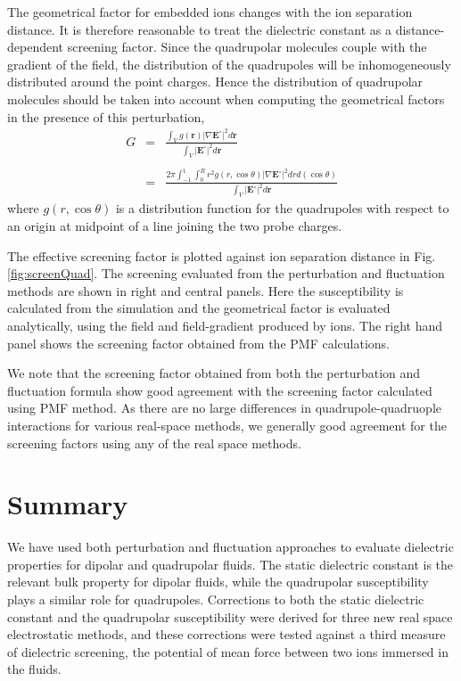 The geometrical factor for embedded ions changes with the ion
separation distance. It is therefore reasonable to treat the
dielectric constant as a distance-dependent screening factor.  Since
the quadrupolar molecules couple with the gradient of the field, the
distribution of the quadrupoles will be inhomogeneously distributed
around the point charges.  Hence the distribution of quadrupolar
molecules should be taken into account when computing the geometrical
factors in the presence of this perturbation,
\begin{eqnarray}
G &=& \frac{\int_V g(\mathbf{r})  \left|\nabla \mathbf{E}^\circ
  \right|^2 d\mathbf{r}}{\int_V\left|\mathbf{E}^\circ\right|^2
  d\mathbf{r}}  \nonumber \\ \nonumber \\
 &=& \frac{ 2 \pi \int_{-1}^{1}  \int_{0}^{R} r^2  g(r,
     \cos\theta)  \left|\nabla \mathbf{E}^\circ  \right|^2 dr d(\cos\theta) }{\int_V\left|\mathbf{E}^\circ\right|^2 d\mathbf{r}}
\label{eq:geometricalFactor}
\end{eqnarray}
where $g(r,\cos\theta)$ is a distribution function for the quadrupoles
with respect to an origin at midpoint of a line joining the two probe
charges.

The effective screening factor is plotted against ion separation
distance in Fig. \ref{fig:screenQuad}.  The screening evaluated from
the perturbation and fluctuation methods are shown in right and
central panels. Here the susceptibility is calculated from the
simulation and the geometrical factor is evaluated analytically, using
the field and field-gradient produced by ions. The right hand panel
shows the screening factor obtained from the PMF calculations.

We note that the screening factor obtained from both the perturbation
and fluctuation formula show good agreement with the screening factor
calculated using PMF method. As there are no large differences in
quadrupole-quadruople interactions for various real-space
methods,\cite{PaperI,PaperII} we generally good agreement for the
screening factors using any of the real space methods.

\section{Summary}
We have used both perturbation and fluctuation approaches to evaluate
dielectric properties for dipolar and quadrupolar fluids.  The static
dielectric constant is the relevant bulk property for dipolar fluids,
while the quadrupolar susceptibility plays a similar role for
quadrupoles.  Corrections to both the static dielectric constant and
the quadrupolar susceptibility were derived for three new real space
electrostatic methods, and these corrections were tested against a
third measure of dielectric screening, the potential of mean force
between two ions immersed in the fluids.

